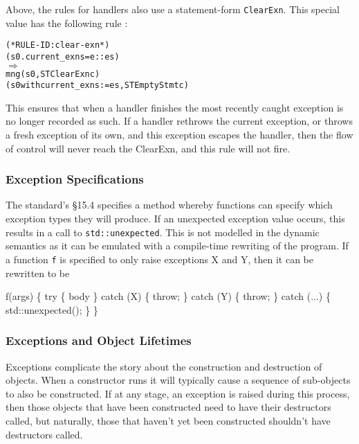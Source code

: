 \documentclass[11pt]{article}
\begin{document}
%
Above, the rules for handlers also use a statement-form
\texttt{ClearExn}.  This special value has the following rule
:
\begin{center}
\begin{minipage}{\textwidth}
\begin{alltt}
(* RULE-ID: clear-exn *)
     (s0.current_exns = e::es)
   \(\Rightarrow\)
     mng (s0, ST ClearExn c)
         (s0 with current_exns := es, ST EmptyStmt c)
\end{alltt}
\end{minipage}
\end{center}
This ensures that when a handler finishes the most recently caught
exception is no longer recorded as such.  If a handler rethrows the
current exception, or throws a fresh exception of its own, and this
exception escapes the handler, then the flow of control will never
reach the \textsf{ClearExn}, and this rule will not fire.

\subsubsection{Exception Specifications}

The standard's \S15.4 specifies a method whereby functions can specify
which exception types they will produce.  If an unexpected exception
value occurs, this results in a call to \texttt{std::unexpected}.
This is not modelled in the dynamic semantics as it can be emulated
with a compile-time rewriting of the program.  If a function
\texttt{f} is specified to only raise exceptions X and Y, then it can
be rewritten to be
\begin{stdrule}
   f(args)
   \{
     try \{
       body
     \}
     catch (X) \{ throw; \}
     catch (Y) \{ throw; \}
     catch (...) \{ std::unexpected(); \}
   \}
\end{stdrule}

\subsubsection{Exceptions and Object Lifetimes}
\label{ref:exceptions-object-lifetimes}

Exceptions complicate the story about the construction and destruction
of objects.  When a constructor runs it will typically cause a
sequence of sub-objects to also be constructed. If at any stage, an
exception is raised during this process, then those objects that have
been constructed need to have their destructors called, but naturally,
those that haven't yet been constructed shouldn't have destructors
called.
\end{document}
